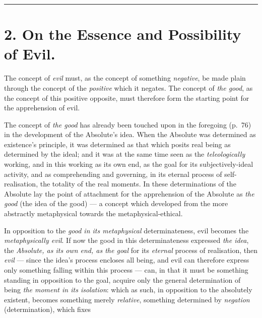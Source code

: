 \documentclass[12pt,a4paper]{book}
\begin{document}
\begin{center}\rule{2cm}{0.4pt}\end{center}

\section*{2. On the Essence and Possibility of Evil.}
The concept of \emph{evil} must, as the concept of something \emph{negative},
be made plain through the concept of the \emph{positive} which it negates. The
concept of \emph{the good}, as the concept of this positive opposite, must
therefore form the starting point for the apprehension of evil.

The concept of \emph{the good} has already been touched upon in the foregoing
(p.\ 76) in the development of the Absolute's idea. When the Absolute was
determined as existence's principle, it was determined as that which posits
real being as determined by the ideal; and it was at the same time seen as the
\emph{teleologically} working, and in this working as its own end, as the goal
for its subjectively-ideal activity, and as comprehending and governing, in its
eternal process of self-realisation, the totality of the real moments. In these
determinations of the Absolute lay the point of attachment for the
apprehension of the Absolute as \emph{the good} (the idea of the good) --- a
concept which developed from the more abstractly metaphysical towards the
metaphysical-ethical.

In opposition to the \emph{good in its metaphysical} determinateness, evil
becomes the \emph{metaphysically evil}. If now the good in this determinateness
expressed \emph{the idea}, the \emph{Absolute, as its own end, as the goal} for
its \emph{eternal} process of realisation, then \emph{evil} --- since the
idea's process encloses all being, and evil can therefore express only
something falling within this process --- can, in that it must be something
standing in opposition to the goal, acquire only the general determination of
being \emph{the moment in its isolation}: which as such, in opposition to the
absolutely existent, becomes something merely \emph{relative}, something
determined by \emph{negation} (determination), which fixes
\end{document}
